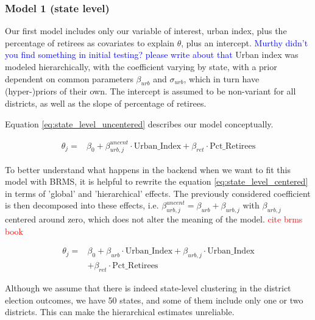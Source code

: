 \documentclass[12pt]{article}
\newcommand{\blue}[1]{\textcolor{blue}{#1}}
\begin{document}
\subsubsection*{Model 1 (state level)}


Our first model includes only our variable of interest, urban index, plus the percentage of retirees as covariates to explain $\theta$, plus an intercept.
\blue{ Murthy didn't you find something in initial testing? please write about that}
Urban index was modeled hierarchically, with the coefficient varying by state, with a prior dependent on common parameters $\beta_{urb}$ and $\sigma_{urb}$, which in turn have (hyper-)priors of their own. The intercept is assumed to be non-variant for all districts, as well as the slope of percentage of retirees.

Equation \ref{eq:state_level_uncentered} describes our model conceptually.


\begin{equation} \label{eq:state_level_uncentered}
	\begin{aligned}
		\theta_{j} =    &\beta_0 + \beta_{urb,j}^{uncent} \cdot \text{Urban\_Index} + \beta_{ret} \cdot \text{Pct\_Retirees}
	\end{aligned}
\end{equation}

To better understand what happens in the backend when we want to fit this model with BRMS, it is helpful to rewrite the equation \ref{eq:state_level_centered} in terms of 'global' and 'hierarchical' effects. The previously considered coefficient is then decomposed into these effects, i.e.
$\beta_{urb,j}^{uncent} = \beta_{urb} + \beta_{urb,j}$
with $\beta_{urb,j}$ centered around zero, which does not alter the meaning of the model. \textcolor{red}{cite brms book}

\begin{equation} \label{eq:state_level_centered}
	\begin{aligned}
		\theta_{j} =    &\beta_0 + \beta_{urb} \cdot \text{Urban\_Index} + \beta_{urb,j} \cdot \text{Urban\_Index} \\
		&+ \beta_{ret} \cdot \text{Pct\_Retirees}
	\end{aligned}
\end{equation}


Although we assume that there is indeed state-level clustering in the district election outcomes, we have 50 states, and some of them include only one or two districts. This can make the hierarchical estimates unreliable. 
\end{document}

